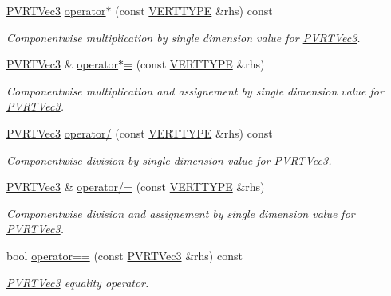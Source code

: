 \begin{DoxyCompactItemize}
\hyperlink{struct_p_v_r_t_vec3}{P\+V\+R\+T\+Vec3} \hyperlink{struct_p_v_r_t_vec3_ab79d890297b83a5eac2008210dfe0798}{operator$\ast$} (const \hyperlink{group___a_p_i___o_g_l_e_s_ga06da457b7d3e93368ab904f89e1396be}{V\+E\+R\+T\+T\+Y\+P\+E} \&rhs) const 
\begin{DoxyCompactList}\small\item\em Componentwise multiplication by single dimension value for \hyperlink{struct_p_v_r_t_vec3}{P\+V\+R\+T\+Vec3}. \end{DoxyCompactList}\item 
\hyperlink{struct_p_v_r_t_vec3}{P\+V\+R\+T\+Vec3} \& \hyperlink{struct_p_v_r_t_vec3_a6dccd33c823fd91a255623f1eff7403e}{operator$\ast$=} (const \hyperlink{group___a_p_i___o_g_l_e_s_ga06da457b7d3e93368ab904f89e1396be}{V\+E\+R\+T\+T\+Y\+P\+E} \&rhs)
\begin{DoxyCompactList}\small\item\em Componentwise multiplication and assignement by single dimension value for \hyperlink{struct_p_v_r_t_vec3}{P\+V\+R\+T\+Vec3}. \end{DoxyCompactList}\item 
\hyperlink{struct_p_v_r_t_vec3}{P\+V\+R\+T\+Vec3} \hyperlink{struct_p_v_r_t_vec3_a5074a48030702059dad015da34c5e657}{operator/} (const \hyperlink{group___a_p_i___o_g_l_e_s_ga06da457b7d3e93368ab904f89e1396be}{V\+E\+R\+T\+T\+Y\+P\+E} \&rhs) const 
\begin{DoxyCompactList}\small\item\em Componentwise division by single dimension value for \hyperlink{struct_p_v_r_t_vec3}{P\+V\+R\+T\+Vec3}. \end{DoxyCompactList}\item 
\hyperlink{struct_p_v_r_t_vec3}{P\+V\+R\+T\+Vec3} \& \hyperlink{struct_p_v_r_t_vec3_a7e483866325cf53738ed8d85e18291f5}{operator/=} (const \hyperlink{group___a_p_i___o_g_l_e_s_ga06da457b7d3e93368ab904f89e1396be}{V\+E\+R\+T\+T\+Y\+P\+E} \&rhs)
\begin{DoxyCompactList}\small\item\em Componentwise division and assignement by single dimension value for \hyperlink{struct_p_v_r_t_vec3}{P\+V\+R\+T\+Vec3}. \end{DoxyCompactList}\item 
bool \hyperlink{struct_p_v_r_t_vec3_abb160f209c31c3523fd956d802799774}{operator==} (const \hyperlink{struct_p_v_r_t_vec3}{P\+V\+R\+T\+Vec3} \&rhs) const 
\begin{DoxyCompactList}\small\item\em \hyperlink{struct_p_v_r_t_vec3}{P\+V\+R\+T\+Vec3} equality operator. \end{DoxyCompactList}\item 

\end{DoxyCompactItemize}
